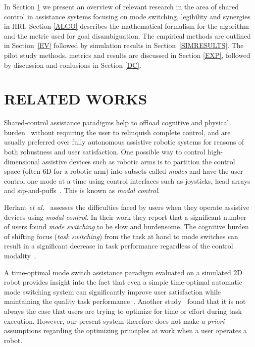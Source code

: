 \documentclass[conference]{IEEEtran}
\begin{document}
In Section \ref{RW} we present an overview of relevant research in the area of shared control in assistance systems focusing on mode switching, legibility and synergies in HRI. Section \ref{ALGO} describes the mathematical formalism for the algorithm and the metric used for goal disambiguation. The empirical methods are outlined in Section~\ref{EV} followed by simulation results in Section~\ref{SIMRESULTS}. The pilot study methods, metrics and results are discussed in Section \ref{EXP}, followed by discussion and conlusions in Section \ref{DC}.

\section{RELATED WORKS}\label{RW} 

Shared-control assistance paradigms help to offload cognitive and physical burden~\cite{volosyak2005rehabilitation} without requiring the user to relinquish complete control, and are usually preferred over fully autonomous assistive robotic systems for reasons of both robustness and user satisfaction. One possible way to control high-dimensional assistive devices such as robotic arms is to partition the control space (often 6D for a robotic arm) into subsets called \textit{modes} and have the user control one mode at a time using control interfaces such as joysticks, head arrays and sip-and-puffs~\cite{tsui2008development, nuttin2002selection}. This is known as \textit{modal control}.

Herlant \textit{et al.}~\cite{herlant2016assistive} assesses the difficulties faced by users when they operate assistive devices using \textit{modal control}. In their work they report that a significant number of users found \textit{mode switching} to be slow and burdensome. The cognitive burden of shifting focus (\textit{task switching})  from the task at hand to mode switches can result in a significant decrease in task performance regardless of the control modality~\cite{monsell2003task}. 

 A time-optimal mode switch assistance paradigm evaluated on a simulated 2D robot provides insight into the fact that even a simple time-optimal automatic mode switching system can significantly improve user satisfaction while maintaining the quality task performance~\cite{herlant2016assistive}.  Another study~\cite{gopinath2017human} found that it is not always the case that users are trying to optimize for time or effort during task execution. However, our present system therefore does not make \textit{a priori} assumptions regarding the optimizing principles at work when a user operates a robot.
\end{document}
